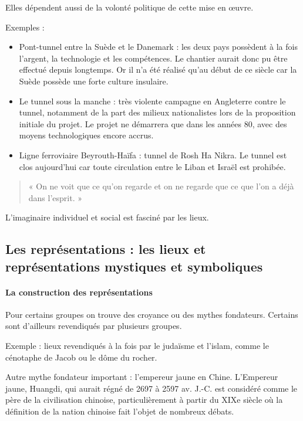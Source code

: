 \documentclass[a4paper,10pt]{article}
\begin{document}
		Elles dépendent aussi de la volonté politique de cette mise en œuvre.

		Exemples :
		\begin{itemize}
		\item Pont-tunnel entre la Suède et le Danemark : les deux pays possèdent à la fois l'argent, la technologie et les compétences.
			Le chantier aurait donc pu être effectué depuis longtemps.
			Or il n'a été réalisé qu'au début de ce siècle car la Suède possède une forte culture insulaire.
		\item Le tunnel sous la manche : très violente campagne en Angleterre contre le tunnel, notamment de la part des milieux nationalistes lors de la proposition initiale du projet.
			Le projet ne démarrera que dans les années 80, avec des moyens technologiques encore accrus.
		\item Ligne ferroviaire Beyrouth-Haïfa : tunnel de Rosh Ha Nikra.
			Le tunnel est clos aujourd'hui car toute circulation entre le Liban et Israël est prohibée.
		\end{itemize}

		\begin{quote}
			« On ne voit que ce qu'on regarde et on ne regarde que ce que l'on a déjà dans l'esprit. »
		\end{quote}

		L'imaginaire individuel et social est fasciné par les lieux.

	\subsection{Les représentations : les lieux et représentations mystiques et symboliques}

		\paragraph{La construction des représentations}

		Pour certains groupes on trouve des croyance ou des mythes fondateurs.
		Certains sont d'ailleurs revendiqués par plusieurs groupes.

		Exemple : lieux revendiqués à la fois par le judaïsme et l'islam, comme le cénotaphe de Jacob ou le dôme du rocher.

		Autre mythe fondateur important : l'empereur jaune en Chine.
		L'Empereur jaune, Huangdi, qui aurait régné de 2697 à 2597 av. J.-C. est considéré comme le père de la civilisation chinoise, particulièrement à partir du XIXe siècle où la définition de la nation chinoise fait l'objet de nombreux débats.
\end{document}
